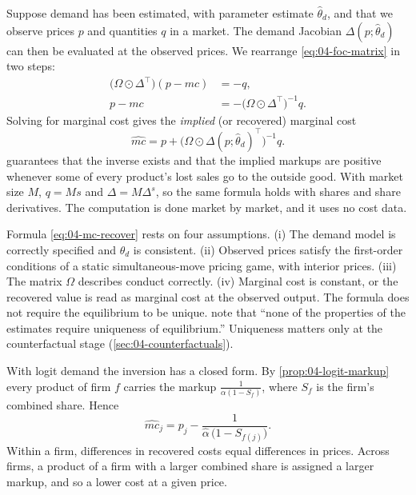 Suppose demand has been estimated, with parameter estimate $\hat\theta_d$, and that we observe prices $p$ and
quantities $q$ in a market. The demand Jacobian $\Delta(p; \hat\theta_d)$ can then be evaluated at the observed
prices. We rearrange \eqref{eq:04-foc-matrix} in two steps:
\begin{align*}
\big(\Omega \odot \Delta^\top\big)(p - mc) &= -q, \\
p - mc &= -\big(\Omega \odot \Delta^\top\big)^{-1} q .
\end{align*}
Solving for marginal cost gives the \emph{implied} (or recovered) marginal cost
\begin{equation}\label{eq:04-mc-recover}
\widehat{mc} = p + \big(\Omega \odot \Delta(p; \hat\theta_d)^\top\big)^{-1} q .
\end{equation}
 guarantees that the inverse exists and that the implied markups are positive
whenever some of every product's lost sales go to the outside good. With market size $M$, $q = Ms$ and
$\Delta = M\Delta^s$, so the same formula holds with shares and share derivatives. The computation is done market
by market, and it uses no cost data.

\begin{remark}\label{rem:04-mc-assumptions}
Formula \eqref{eq:04-mc-recover} rests on four assumptions. (i) The demand model is correctly specified and
$\hat\theta_d$ is consistent. (ii) Observed prices satisfy the first-order conditions of a static
simultaneous-move pricing game, with interior prices. (iii) The matrix $\Omega$ describes conduct correctly.
(iv) Marginal cost is constant, or the recovered value is read as marginal cost at the observed output. The
formula does not require the equilibrium to be unique. \citet[fn.~12]{BerryLevinsohnPakes1995} note that ``none
of the properties of the estimates require uniqueness of equilibrium.'' Uniqueness matters only at the
counterfactual stage (\cref{sec:04-counterfactuals}).
\end{remark}

With logit demand the inversion has a closed form. By \cref{prop:04-logit-markup} every product of firm $f$
carries the markup $\frac{1}{\alpha(1 - S_f)}$, where $S_f$ is the firm's combined share. Hence
\begin{equation}\label{eq:04-mc-logit}
\widehat{mc}_j = p_j - \frac{1}{\hat\alpha\,\big(1 - S_{f(j)}\big)} .
\end{equation}
Within a firm, differences in recovered costs equal differences in prices. Across firms, a product of a firm with
a larger combined share is assigned a larger markup, and so a lower cost at a given price.

